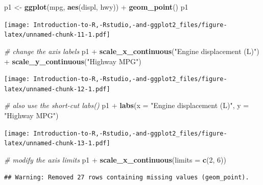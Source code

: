 \documentclass[]{book}
\newenvironment{Shaded}{\begin{snugshade}}{\end{snugshade}}
\newcommand{\KeywordTok}[1]{\textcolor[rgb]{0.13,0.29,0.53}{\textbf{{#1}}}}
\newcommand{\DataTypeTok}[1]{\textcolor[rgb]{0.13,0.29,0.53}{{#1}}}
\newcommand{\DecValTok}[1]{\textcolor[rgb]{0.00,0.00,0.81}{{#1}}}
\newcommand{\StringTok}[1]{\textcolor[rgb]{0.31,0.60,0.02}{{#1}}}
\newcommand{\CommentTok}[1]{\textcolor[rgb]{0.56,0.35,0.01}{\textit{{#1}}}}
\newcommand{\NormalTok}[1]{{#1}}
\begin{document}
\begin{Shaded}
\begin{Highlighting}[]
\NormalTok{p1 <-}\StringTok{ }\KeywordTok{ggplot}\NormalTok{(mpg, }\KeywordTok{aes}\NormalTok{(displ, hwy)) +}\StringTok{ }\KeywordTok{geom_point}\NormalTok{()}
\NormalTok{p1}
\end{Highlighting}
\end{Shaded}

\texttt{[image: Introduction-to-R,-Rstudio,-and-ggplot2\_files/figure-latex/unnamed-chunk-11-1.pdf]}

\begin{Shaded}
\begin{Highlighting}[]
\CommentTok{# change the axis labels}
\NormalTok{p1 +}\StringTok{ }\KeywordTok{scale_x_continuous}\NormalTok{(}\StringTok{"Engine displacement (L)"}\NormalTok{) +}
\StringTok{  }\KeywordTok{scale_y_continuous}\NormalTok{(}\StringTok{"Highway MPG"}\NormalTok{)}
\end{Highlighting}
\end{Shaded}

\texttt{[image: Introduction-to-R,-Rstudio,-and-ggplot2\_files/figure-latex/unnamed-chunk-12-1.pdf]}

\begin{Shaded}
\begin{Highlighting}[]
\CommentTok{# also use the short-cut labs()}
\NormalTok{p1 +}\StringTok{ }\KeywordTok{labs}\NormalTok{(}\DataTypeTok{x =} \StringTok{"Engine displacement (L)"}\NormalTok{, }\DataTypeTok{y =} \StringTok{"Highway MPG"}\NormalTok{)}
\end{Highlighting}
\end{Shaded}

\texttt{[image: Introduction-to-R,-Rstudio,-and-ggplot2\_files/figure-latex/unnamed-chunk-13-1.pdf]}

\begin{Shaded}
\begin{Highlighting}[]
\CommentTok{# modify the axis limits}
\NormalTok{p1 +}\StringTok{ }\KeywordTok{scale_x_continuous}\NormalTok{(}\DataTypeTok{limits =} \KeywordTok{c}\NormalTok{(}\DecValTok{2}\NormalTok{, }\DecValTok{6}\NormalTok{))}
\end{Highlighting}
\end{Shaded}

\begin{verbatim}
## Warning: Removed 27 rows containing missing values (geom_point).
\end{verbatim}
\end{document}
